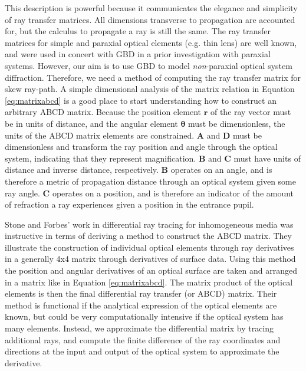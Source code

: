This description is powerful because it communicates the elegance and simplicity of ray transfer matrices. All dimensions transverse to propagation are accounted for, but the calculus to propagate a ray is still the same. The ray transfer matrices for simple and paraxial optical elements (e.g. thin lens) are well known\cite{Brouwer64}, and were used in concert with GBD in a prior investigation with paraxial systems\cite{Ashcraft2020}. However, our aim is to use GBD to model \emph{non}-paraxial optical system diffraction. Therefore, we need a method of computing the ray transfer matrix for  skew ray-path. 
A simple dimensional analysis of the matrix relation in Equation \ref{eq:matrixabcd} is a good place to start understanding how to construct an arbitrary ABCD matrix. Because the position element $\mathbf{r}$ of the ray vector must be in units of distance, and the angular element $\boldsymbol{\theta}$ must be dimensionless, the units of the ABCD matrix elements are constrained. $\mathbf{A}$ and $\mathbf{D}$ must be dimensionless and transform the ray position and angle through the optical system, indicating that they represent magnification. $\mathbf{B}$ and $\mathbf{C}$ must have units of distance and inverse distance, respectively. $\mathbf{B}$ operates on an angle, and is therefore a metric of propagation distance through an optical system given some ray angle. $\mathbf{C}$ operates on a position, and is therefore an indicator of the amount of refraction a ray experiences given a position in the entrance pupil.

Stone and Forbes'\cite{Stone:97} work in differential ray tracing for inhomogeneous media was instructive in terms of deriving a method to construct the ABCD matrix. They illustrate the construction of individual optical elements through ray derivatives in a generally 4x4 matrix through derivatives of surface data. Using this method the position and angular derivatives of an optical surface are taken and arranged in a matrix like in Equation \ref{eq:matrixabcd}. The matrix product of the optical elements is then the final differential ray transfer (or ABCD) matrix. Their method is functional if the analytical expression of the optical elements are known, but could be very computationally intensive if the optical system has many elements. Instead, we approximate the differential matrix by tracing additional rays, and compute the finite difference of the ray coordinates and directions at the input and output of the optical system to approximate the derivative.

